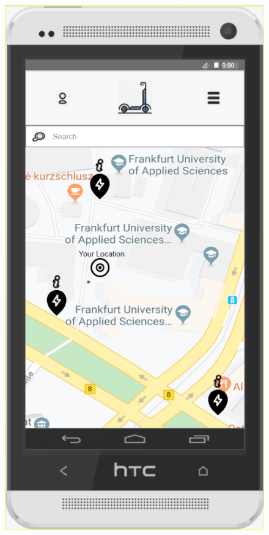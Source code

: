 \documentclass[a4paper, 12pt]{article}
\begin{document}
\begin{figure} [htbp]
    \begin{center}
        \begin{minipage}{0.45\textwidth}
            \begin{center}
                 \includegraphics[scale=0.65]{images/prototypes/01-start-menu.png}

\end{center}
\end{minipage}
\end{center}
\end{figure}
\end{document}
